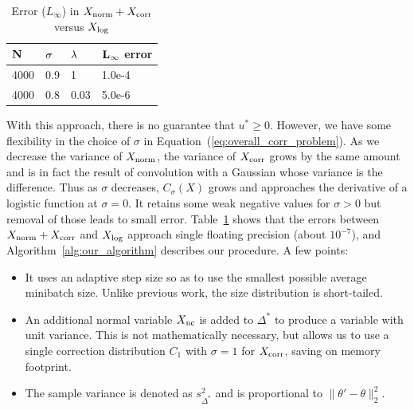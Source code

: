 \documentclass[twoside]{article} \usepackage{aistats2017}
\begin{document}
\begin{table}[t]
    \caption{Error ($L_\infty$) in $X_{\rm norm}+X_{\rm corr}$ versus $X_{\rm log}$}
    \label{tab:xcorr}
    \centering
    \begin{tabular}{l l l l}
    ${\bf N}$ & ${\bf \sigma}$ & ${\bf \lambda}$ & ${\bf L_{\infty}}$ {\bf error} \\
    \hline
    4000 & 0.9 & 1 & 1.0e-4  \\
    4000 & 0.8 & 0.03 & 5.0e-6
    \end{tabular}
\end{table}

With this approach, there is no guarantee that $u^* \geq 0$. However, we have
some flexibility in the choice of $\sigma$ in Equation~(\ref{eq:overall_corr_problem}).
As we decrease the variance of $X_{\rm norm}$, the variance of $X_{\rm corr}$
grows by the same amount and is in fact the result of convolution with a
Gaussian whose variance is the difference.  Thus as $\sigma$ decreases,
$C_\sigma(X)$ grows and approaches the derivative of a logistic function at
$\sigma = 0$. It retains some weak negative values for $\sigma > 0$ but removal
of those leads to small error. Table~\ref{tab:xcorr} shows that the errors
between $X_{\rm norm}+X_{\rm corr}$ and $X_{\rm log}$ approach single floating
precision (about $10^{-7}$), and Algorithm~\ref{alg:our_algorithm} describes our
procedure. A few points:

\begin{itemize}[noitemsep]
    \item It uses an adaptive step size so as to use the smallest possible
    average minibatch size. Unlike previous work, the size distribution is
    short-tailed.

    \item An additional normal variable $X_{\rm nc}$ is added to $\Delta^*$ to
    produce a variable with unit variance. This is not mathematically necessary,
    but allows us to use a single correction distribution $C_1$ with $\sigma=1$
    for $X_{\rm corr}$, saving on memory footprint.

    \item The sample variance is denoted as $s^2_{\Delta^*}$ and is proportional
    to $\|\theta'-\theta\|_2^2$.
    
\end{itemize}
\end{document}
